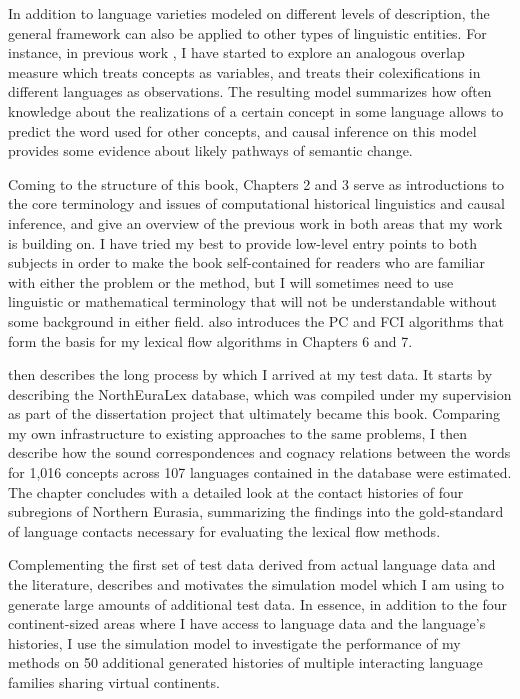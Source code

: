 In addition to language varieties modeled on different levels of description, the general framework can also be applied to other types of linguistic entities. For instance, in previous work \citep{dellert2016b}, I have started to explore an analogous overlap measure which treats concepts as variables, and treats their colexifications in different languages as observations. The resulting model summarizes how often knowledge about the realizations of a certain concept in some language allows to predict the word used for other concepts, and causal inference on this model provides some evidence about likely pathways of semantic change.

Coming to the structure of this book, Chapters 2 and 3 serve as introductions to the core terminology and issues of computational historical linguistics and causal inference, and give an overview of the previous work in both areas that my work is building on. I have tried my best to provide low-level entry points to both subjects in order to make the book self-contained for readers who are familiar with either the problem or the method, but I will sometimes need to use linguistic or mathematical terminology that will not be understandable without some background in either field.  also introduces the PC and FCI algorithms that form the basis for my lexical flow algorithms in Chapters 6 and 7.

 then describes the long process by which I arrived at my test data. It starts by describing the NorthEuraLex database, which was compiled under my supervision as part of the dissertation project that ultimately became this book. Comparing my own infrastructure to existing approaches to the same problems, I then describe how the sound correspondences and cognacy relations between the words for 1,016 concepts across 107 languages contained in the database were estimated. The chapter concludes with a detailed look at the contact histories of four subregions of Northern Eurasia, summarizing the findings into the gold-standard of language contacts necessary for evaluating the lexical flow methods.

Complementing the first set of test data derived from actual language data and the literature,  describes and motivates the simulation model which I am using to generate large amounts of additional test data. In essence, in addition to the four continent-sized areas where I have access to language data and the language's histories, I use the simulation model to investigate the performance of my methods on 50 additional generated histories of multiple interacting language families sharing virtual continents.

